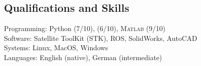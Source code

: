 \subsection*{Qualifications and Skills}
{}

Programming: Python (7/10), \CC (6/10), \textsc{Matlab} (9/10) \\
Software: Satellite ToolKit (STK), ROS, SolidWorks, AutoCAD \\
Systems: Linux, MacOS, Windows \\
Languages: English (native), German (intermediate)
